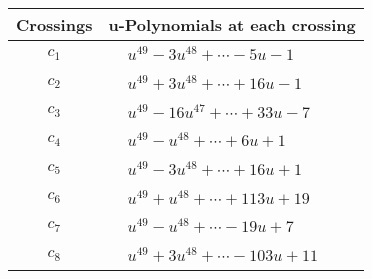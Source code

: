 \documentclass[1p]{elsarticle_modified}
\theoremstyle{definition}
\begin{document}
\begin{tabular}{m{50pt}|m{274pt}}
Crossings & \hspace{64pt}u-Polynomials at each crossing \\
\hline $$\begin{aligned}c_{1}\end{aligned}$$&$\begin{aligned}
&u^{49}-3 u^{48}+\cdots-5 u-1
\end{aligned}$\\
\hline $$\begin{aligned}c_{2}\end{aligned}$$&$\begin{aligned}
&u^{49}+3 u^{48}+\cdots+16 u-1
\end{aligned}$\\
\hline $$\begin{aligned}c_{3}\end{aligned}$$&$\begin{aligned}
&u^{49}-16 u^{47}+\cdots+33 u-7
\end{aligned}$\\
\hline $$\begin{aligned}c_{4}\end{aligned}$$&$\begin{aligned}
&u^{49}- u^{48}+\cdots+6 u+1
\end{aligned}$\\
\hline $$\begin{aligned}c_{5}\end{aligned}$$&$\begin{aligned}
&u^{49}-3 u^{48}+\cdots+16 u+1
\end{aligned}$\\
\hline $$\begin{aligned}c_{6}\end{aligned}$$&$\begin{aligned}
&u^{49}+u^{48}+\cdots+113 u+19
\end{aligned}$\\
\hline $$\begin{aligned}c_{7}\end{aligned}$$&$\begin{aligned}
&u^{49}- u^{48}+\cdots-19 u+7
\end{aligned}$\\
\hline $$\begin{aligned}c_{8}\end{aligned}$$&$\begin{aligned}
&u^{49}+3 u^{48}+\cdots-103 u+11
\end{aligned}$\\

\end{tabular}
\end{document}
